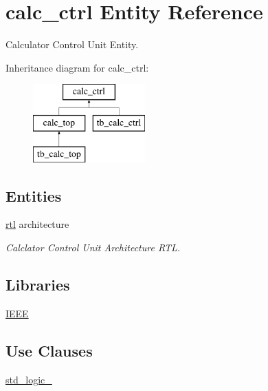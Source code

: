 \hypertarget{classcalc__ctrl}{}\section{calc\+\_\+ctrl Entity Reference}
\label{classcalc__ctrl}


Calculator Control Unit Entity.  


Inheritance diagram for calc\+\_\+ctrl\+:\begin{figure}[H]
\begin{center}
\leavevmode
\includegraphics[height=3.000000cm]{classcalc__ctrl}
\end{center}
\end{figure}
\subsection*{Entities}
\begin{DoxyCompactItemize}
\item 
\hyperlink{classcalc__ctrl_1_1rtl}{rtl} architecture
\begin{DoxyCompactList}\small\item\em Calclator Control Unit Architecture R\+TL. \end{DoxyCompactList}\end{DoxyCompactItemize}
\subsection*{Libraries}
 \begin{DoxyCompactItemize}
\item 
\hyperlink{classcalc__ctrl_ae4f03c286607f3181e16b9aa12d0c6d4}{I\+E\+EE} 
\end{DoxyCompactItemize}
\subsection*{Use Clauses}
 \begin{DoxyCompactItemize}
\item 
\hyperlink{classcalc__ctrl_acd03516902501cd1c7296a98e22c6fcb}{std\+\_\+logic\+\_}   
\end{DoxyCompactItemize}
